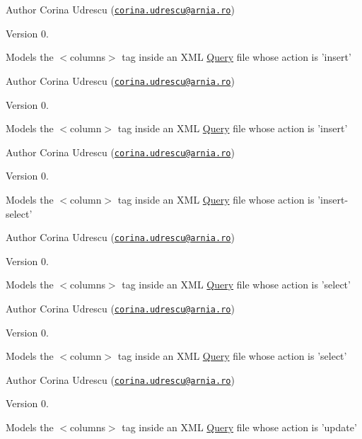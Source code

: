 \begin{DoxyAuthor}{Author}
Corina Udrescu (\href{mailto:corina.udrescu@arnia.ro}{\tt corina.\+udrescu@arnia.\+ro})  
\end{DoxyAuthor}
\begin{DoxyVersion}{Version}
0.
\end{DoxyVersion}
Models the $<$columns$>$ tag inside an X\+M\+L \hyperlink{classQuery}{Query} file whose action is 'insert'

\begin{DoxyAuthor}{Author}
Corina Udrescu (\href{mailto:corina.udrescu@arnia.ro}{\tt corina.\+udrescu@arnia.\+ro})  
\end{DoxyAuthor}
\begin{DoxyVersion}{Version}
0.
\end{DoxyVersion}
Models the $<$column$>$ tag inside an X\+M\+L \hyperlink{classQuery}{Query} file whose action is 'insert'

\begin{DoxyAuthor}{Author}
Corina Udrescu (\href{mailto:corina.udrescu@arnia.ro}{\tt corina.\+udrescu@arnia.\+ro})  
\end{DoxyAuthor}
\begin{DoxyVersion}{Version}
0.
\end{DoxyVersion}
Models the $<$column$>$ tag inside an X\+M\+L \hyperlink{classQuery}{Query} file whose action is 'insert-\/select'

\begin{DoxyAuthor}{Author}
Corina Udrescu (\href{mailto:corina.udrescu@arnia.ro}{\tt corina.\+udrescu@arnia.\+ro})  
\end{DoxyAuthor}
\begin{DoxyVersion}{Version}
0.
\end{DoxyVersion}
Models the $<$columns$>$ tag inside an X\+M\+L \hyperlink{classQuery}{Query} file whose action is 'select'

\begin{DoxyAuthor}{Author}
Corina Udrescu (\href{mailto:corina.udrescu@arnia.ro}{\tt corina.\+udrescu@arnia.\+ro})  
\end{DoxyAuthor}
\begin{DoxyVersion}{Version}
0.
\end{DoxyVersion}
Models the $<$column$>$ tag inside an X\+M\+L \hyperlink{classQuery}{Query} file whose action is 'select'

\begin{DoxyAuthor}{Author}
Corina Udrescu (\href{mailto:corina.udrescu@arnia.ro}{\tt corina.\+udrescu@arnia.\+ro})  
\end{DoxyAuthor}
\begin{DoxyVersion}{Version}
0.
\end{DoxyVersion}
Models the $<$columns$>$ tag inside an X\+M\+L \hyperlink{classQuery}{Query} file whose action is 'update'

